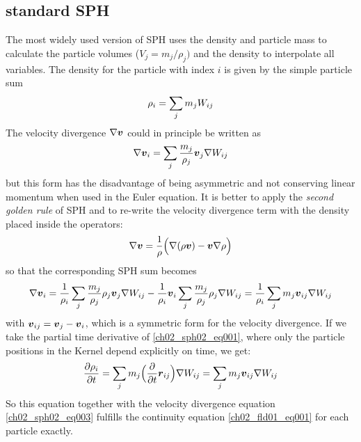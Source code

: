 \subsection{standard SPH}
The most widely used version of SPH uses the density and particle mass to calculate the particle volumes ($V_j = m_j / \rho_j)$ and the density to interpolate all variables. The density for the particle with index $i$ is given by the simple particle sum
\begin{equation}
\label{ch02_sph02_eq001}
\rho_i = \sum_{j} m_j W_{ij}
\end{equation}
The velocity divergence $\nabla \boldsymbol{v}$ could in principle be written as
\begin{equation}
\label{ch02_sph02_eq002}
\nabla \boldsymbol{v}_i = \sum_{j} \frac{m_j}{\rho_j} \boldsymbol{v}_j \nabla W_{ij}
\end{equation}
but this form has the disadvantage of being asymmetric and not conserving linear momentum when used in the Euler equation. It is better to apply the \emph{second golden rule} of SPH \citep{Monaghan:1992p3721} and to re-write the velocity divergence term with the density placed inside the operators:
\begin{equation}
\label{ch02_sph02_eq003}
\nabla \boldsymbol{v} = \frac{1}{\rho} \Big( \nabla (\rho \boldsymbol{v}) - \boldsymbol{v} \nabla \rho \Big)
\end{equation}
so that the corresponding SPH sum becomes 
\begin{equation}
\label{ch02_sph02_eq003}
\nabla \boldsymbol{v}_i = \frac{1}{\rho_i} \sum_{j} \frac{m_j}{\rho_j} \rho_j \boldsymbol{v}_j \nabla W_{ij} - \frac{1}{\rho_i} \boldsymbol{v}_i \sum_{j} \frac{m_j}{\rho_j} \rho_j \nabla W_{ij} = \frac{1}{\rho_i} \sum_{j} m_j \boldsymbol{v}_{ij} \nabla W_{ij} 
\end{equation}
with $\boldsymbol{v}_{ij} = \boldsymbol{v}_j - \boldsymbol{v}_i$, which is a symmetric form for the velocity divergence. If we take the partial time derivative of \ref{ch02_sph02_eq001}, where only the particle positions in the Kernel depend explicitly on time, we get: 
\begin{equation}
\label{ch02_sph02_eq004}
\frac{\partial \rho_i}{\partial t}  = \sum_{j} m_j \Big( \frac{\partial}{\partial t} \boldsymbol{r}_{ij} \Big) \nabla W_{ij} = \sum_{j} m_j \boldsymbol{v}_{ij} \nabla W_{ij} 
\end{equation}
So this equation together with the velocity divergence equation \ref{ch02_sph02_eq003} fulfills the continuity equation \ref{ch02_fld01_eq001} for each particle exactly.

